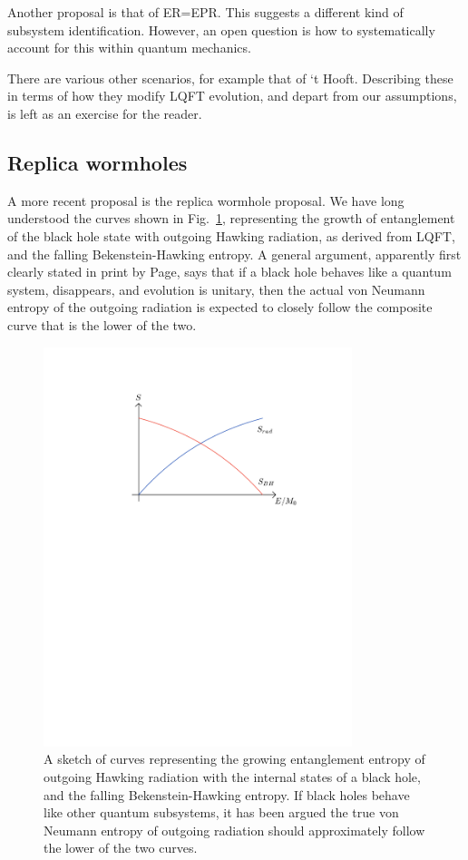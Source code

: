 \documentclass[12pt]{article}
\numberwithin{equation}{section}
\begin{document}
Another proposal is that of ER=EPR\cite{MaSu}.  This suggests a different kind of subsystem identification.  However, an open question is how to systematically account for this within quantum mechanics.

There are various other scenarios, for example that of `t Hooft\cite{thooft}.  Describing these in terms of how they modify LQFT evolution, and depart from our assumptions, is left as an exercise for the reader.



\subsection{Replica wormholes}

A more recent proposal is the replica wormhole proposal\cite{AEMM,AMMZ,PSSY,AHMST,AHMSTrev}.  We have long understood the curves shown in Fig.~\ref{Figent}, representing the growth of entanglement of the black hole state with outgoing Hawking radiation, as derived from LQFT, and the falling Bekenstein-Hawking entropy.  A general argument, apparently first clearly stated in print by Page\cite{Pageav,Pageinfo}, says that if a black hole behaves like a quantum system, disappears, and evolution is unitary, then the actual von Neumann entropy of the outgoing radiation is expected to closely follow the composite curve that is the lower of the two.

\begin{figure}[!hbtp] \begin{center}
\includegraphics[width=9cm]{Fig-entcurves.pdf}
\end{center}
\caption{A sketch of curves representing the growing entanglement entropy of outgoing Hawking radiation with the internal states of a black hole, and the falling Bekenstein-Hawking entropy.  If black holes behave like other quantum subsystems, it has been argued the true von Neumann entropy of outgoing radiation should approximately follow the lower of the two curves.}
\label{Figent}
\end{figure} 
\end{document}
